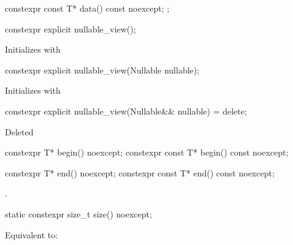 \documentclass[a4paper,10pt,oneside,openany,final,article]{memoir}
\begin{document}
\begin{wording}
\begin{codeblock}
{    constexpr const T* data() const noexcept;
};

\end{codeblock}



%

\pnum
\begin{itemdecl}
  constexpr explicit nullable_view();
\end{itemdecl}
\begin{itemdescr}
  \pnum{}
  \effects{}
  Initializes  with 
\end{itemdescr}

\begin{itemdecl}
  constexpr explicit nullable_view(Nullable nullable);
\end{itemdecl}
\begin{itemdescr}
  \pnum{}
  \effects{}
  Initializes  with 
\end{itemdescr}


\begin{itemdecl}
constexpr explicit nullable_view(Nullable&& nullable) = delete;
\end{itemdecl}
\begin{itemdescr}
  \pnum{}
  Deleted
\end{itemdescr}

\begin{itemdecl}
  constexpr T* begin() noexcept;
  constexpr const T* begin() const noexcept;
\end{itemdecl}

\begin{itemdescr}
  \pnum
  \returns
\end{itemdescr}

\begin{itemdecl}
  constexpr T* end() noexcept;
  constexpr const T* end() const noexcept;
\end{itemdecl}

\begin{itemdescr}
  \pnum{}
  \returns
  .
\end{itemdescr}

\begin{itemdecl}
  static constexpr size_t size() noexcept;
\end{itemdecl}

\begin{itemdescr}
  \pnum{}
  \effects{}
  Equivalent to:


\end{itemdescr}
\end{wording}
\end{document}
